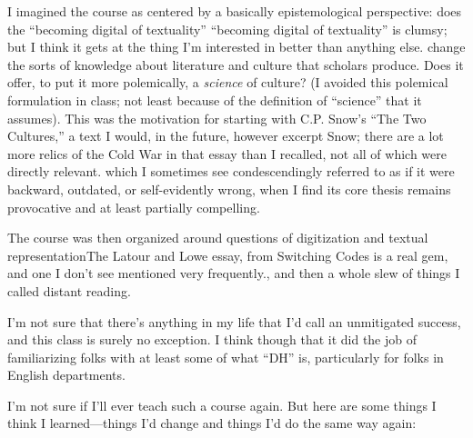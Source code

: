 \documentclass[
  12pt,
]{article}
\begin{document}
I imagined the course as centered by a basically epistemological
perspective: does the ``becoming digital of textuality'' {``becoming
digital of textuality'' is clumsy; but I think it gets at the thing I'm
interested in better than anything else.} change the sorts of knowledge
about literature and culture that scholars produce. Does it offer, to
put it more polemically, a \emph{science} of culture? (I avoided this
polemical formulation in class; not least because of the definition of
``science'' that it assumes). This was the motivation for starting with
C.P. Snow's ``The Two Cultures,'' a text {I would, in the future,
however excerpt Snow; there are a lot more relics of the Cold War in
that essay than I recalled, not all of which were directly relevant.}
which I sometimes see condescendingly referred to as if it were
backward, outdated, or self-evidently wrong, when I find its core thesis
remains provocative and at least partially compelling.

The course was then organized around questions of digitization and
textual representation{The Latour and Lowe essay, from Switching Codes
is a real gem, and one I don't see mentioned very frequently.}, and then
a whole slew of things I called distant reading.

I'm not sure that there's anything in my life that I'd call an
unmitigated success, and this class is surely no exception. I think
though that it did the job of familiarizing folks with at least some of
what ``DH'' is, particularly for folks in English departments.

I'm not sure if I'll ever teach such a course again. But here are some
things I think I learned---things I'd change and things I'd do the same
way again:
\end{document}
